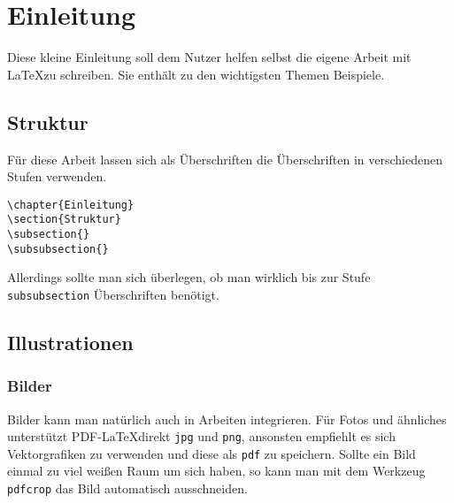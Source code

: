 \chapter{Einleitung}

Diese kleine Einleitung soll dem Nutzer helfen selbst die eigene Arbeit mit \LaTeX zu schreiben. Sie enthält zu den wichtigsten Themen Beispiele.


\section{Struktur}

Für diese Arbeit lassen sich als Überschriften die Überschriften in verschiedenen Stufen verwenden.

\begin{verbatim}
\chapter{Einleitung}
\section{Struktur}
\subsection{}
\subsubsection{}
\end{verbatim}

Allerdings sollte man sich überlegen, ob man wirklich bis zur Stufe \verb|subsubsection| Überschriften benötigt.



\section{Illustrationen}


\subsection{Bilder}

Bilder kann man natürlich auch in Arbeiten integrieren. Für Fotos und ähnliches
unterstützt PDF-\LaTeX direkt \verb|jpg| und \verb|png|, ansonsten empfiehlt es
sich Vektorgrafiken zu verwenden und diese als \verb|pdf| zu speichern. Sollte
ein Bild einmal zu viel weißen Raum um sich haben, so kann man mit dem Werkzeug
\verb|pdfcrop| das Bild automatisch ausschneiden\cite{Schneider2009}.

